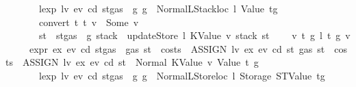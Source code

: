 \begin{isabellebody}
\ \ \ \ \ \ \ {\isachardoublequoteopen}lexp\ lv\ ev\ cd\ {\isacharparenleft}{\kern0pt}st{\isasymlparr}gas\ {\isacharcolon}{\kern0pt}{\isacharequal}{\kern0pt}\ g{\isasymrparr}{\isacharparenright}{\kern0pt}\ g\ {\isacharequal}{\kern0pt}\ Normal{\isacharparenleft}{\kern0pt}{\isacharparenleft}{\kern0pt}LStackloc\ l{\isacharcomma}{\kern0pt}\ Value\ t{\isacharprime}{\kern0pt}{\isacharparenright}{\kern0pt}{\isacharcomma}{\kern0pt}g{\isacharprime}{\kern0pt}{\isacharparenright}{\kern0pt}{\isachardoublequoteclose}\isanewline
\ \ \ \ \ \ \ {\isachardoublequoteopen}convert\ t\ t{\isacharprime}{\kern0pt}\ v\ {\isacharequal}{\kern0pt}\ Some\ v{\isacharprime}{\kern0pt}{\isachardoublequoteclose}\isanewline
\ \ \ \ \ \ \ {\isachardoublequoteopen}st{\isacharprime}{\kern0pt}\ {\isacharequal}{\kern0pt}\ st{\isasymlparr}gas\ {\isacharcolon}{\kern0pt}{\isacharequal}{\kern0pt}\ g{\isacharprime}{\kern0pt}{\isacharcomma}{\kern0pt}\ stack\ {\isacharcolon}{\kern0pt}{\isacharequal}{\kern0pt}\ updateStore\ l\ {\isacharparenleft}{\kern0pt}KValue\ v{\isacharprime}{\kern0pt}{\isacharparenright}{\kern0pt}\ {\isacharparenleft}{\kern0pt}stack\ st{\isacharparenright}{\kern0pt}{\isasymrparr}{\isachardoublequoteclose}\isanewline
\ \ {\isacharbar}{\kern0pt}\ {\isacharparenleft}{\kern0pt}{}{\isacharparenright}{\kern0pt}\ v\ t\ g\ l\ t{\isacharprime}{\kern0pt}\ g{\isacharprime}{\kern0pt}\ v{\isacharprime}{\kern0pt}\isanewline
\ \ \ \ \ {\isachardoublequoteopen}expr\ ex\ ev\ cd\ {\isacharparenleft}{\kern0pt}st{\isasymlparr}gas\ {\isacharcolon}{\kern0pt}{\isacharequal}{\kern0pt}\ gas\ st\ {\isacharminus}{\kern0pt}\ costs\ \ {\isacharparenleft}{\kern0pt}ASSIGN\ lv\ ex{\isacharparenright}{\kern0pt}\ ev\ cd\ st{\isasymrparr}{\isacharparenright}{\kern0pt}\ {\isacharparenleft}{\kern0pt}gas\ st\ {\isacharminus}{\kern0pt}\ costs\ \ {\isacharparenleft}{\kern0pt}ASSIGN\ lv\ ex{\isacharparenright}{\kern0pt}\ ev\ cd\ st{\isacharparenright}{\kern0pt}\ {\isacharequal}{\kern0pt}\ Normal\ {\isacharparenleft}{\kern0pt}{\isacharparenleft}{\kern0pt}KValue\ v{\isacharcomma}{\kern0pt}\ Value\ t{\isacharparenright}{\kern0pt}{\isacharcomma}{\kern0pt}\ g{\isacharparenright}{\kern0pt}{\isachardoublequoteclose}\isanewline
\ \ \ \ \ \ \ {\isachardoublequoteopen}lexp\ lv\ ev\ cd\ {\isacharparenleft}{\kern0pt}st{\isasymlparr}gas\ {\isacharcolon}{\kern0pt}{\isacharequal}{\kern0pt}\ g{\isasymrparr}{\isacharparenright}{\kern0pt}\ g\ {\isacharequal}{\kern0pt}\ Normal{\isacharparenleft}{\kern0pt}{\isacharparenleft}{\kern0pt}LStoreloc\ l{\isacharcomma}{\kern0pt}\ Storage\ {\isacharparenleft}{\kern0pt}STValue\ t{\isacharprime}{\kern0pt}{\isacharparenright}{\kern0pt}{\isacharparenright}{\kern0pt}{\isacharcomma}{\kern0pt}g{\isacharprime}{\kern0pt}{\isacharparenright}{\kern0pt}{\isachardoublequoteclose}\isanewline

\end{isabellebody}
